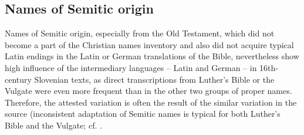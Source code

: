 \documentclass[output=paper,colorlinks,citecolor=brown,arabicfont,chinesefont]{langscibook}
\begin{document}
\subsection{Names of Semitic origin}

Names of Semitic origin, especially from the Old Testament, which did not become a part of the Christian names inventory and also did not acquire typical Latin endings in the Latin or German translations of the Bible, nevertheless show high influence of the intermediary languages – Latin and German – in 16th-century Slovenian texts, as direct transcriptions from Luther’s Bible or the Vulgate were even more frequent than in the other two groups of proper names. Therefore, the attested variation is often the result of the similar variation in the source (inconsistent adaptation of Semitic names is typical for both Luther’s Bible and the Vulgate; cf. \citet[352ff]{Krasovec2006}. 
\end{document}
